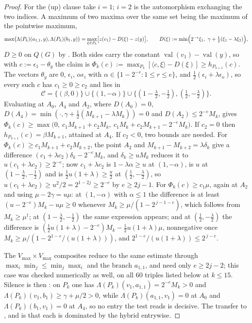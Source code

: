 \documentclass[11pt]{article}
\theoremstyle{plain}
\theoremstyle{definition}
\DeclareMathOperator{\val}{val}
\newcommand{\Vmax}{V_{\max}}
\begin{document}
\begin{proof}
For the (up) clause take $i=1$; $i=2$ is the automorphism exchanging the
two indices. A maximum of two maxima over the same set being the maximum
of the pointwise maximum,
\[
  \max\bigl(\Lambda(P_k)(a_{1,1},y),\Lambda(P_k)(b_1,y)\bigr)
  =\max_{\xi\in P_k}\bigl[z(v_1)-D(\xi)-z(y)\bigr],\qquad
  D(\xi):=\min\Bigl(2^{-e}\xi_1,\ \gamma+\tfrac12(\xi_1-\lambda\xi_2)\Bigr),
\]
$D\ge0$ on $Q(G)$ by . Both sides carry the constant
$\val(v_1)-\val(y)$, so with $c:=\epsilon_1-\theta_y$ the claim is
$\Phi_k(c):=\max_{P_k}[\langle c,\xi\rangle-D(\xi)]\ge h_{P_{k+1}}(c)$.
The vectors $\theta_y$ are $0$, $\epsilon_i$, $\alpha\epsilon_i$ with
$\alpha\in\{1-2^{-r}:1\le r\le e\}$, and
$\tfrac12(\epsilon_i+\lambda\epsilon_o)$, so every such $c$ has
$c_1\ge0\ge c_2$ and lies in
\[
  \mathcal C=\{(\beta,0)\}\cup\{(1,-\alpha)\}\cup
  \bigl\{(1-\tfrac\lambda2,-\tfrac12),(\tfrac12,-\tfrac\lambda2)\bigr\}.
\]
Evaluating at $A_0$, $A_4$ and $A_2$, where $D(A_0)=0$,
$D(A_4)=\min(\cdot,\gamma+\tfrac12(M_{k+1}-\lambda M_k))=0$ and
$D(A_2)\le2^{-e}M_k$, gives
$\Phi_k(c)\ge\max\bigl(0,\ c_1M_{k+1}+c_2M_k,\ c_1M_k+c_2M_{k+1}-2^{-e}M_k\bigr)$.
If $c_2=0$ then $h_{P_{k+1}}(c)=\beta M_{k+1}$, attained at $A_4$. If
$c_2<0$, two bounds are needed. For
$\Phi_k(c)\ge c_1M_{k+1}+c_2M_{k+2}$, the point $A_2$ and
$M_{k+1}-M_{k+2}=\lambda\delta_k$ give a difference
$(c_1+\lambda c_2)\delta_k-2^{-e}M_k$, and $\delta_k\ge uM_k$ reduces it to
$u(c_1+\lambda c_2)\ge2^{-e}$; now $c_1+\lambda c_2$ is $1-\lambda\alpha\ge u$
at $(1,-\alpha)$, is $u$ at $(1-\tfrac\lambda2,-\tfrac12)$ and is
$\tfrac12u(1+\lambda)\ge\tfrac u2$ at $(\tfrac12,-\tfrac\lambda2)$, so
$u(c_1+\lambda c_2)\ge u^2/2=2^{1-2j}\ge2^{-e}$ by $e\ge2j-1$. For
$\Phi_k(c)\ge c_1\mu$, again at $A_2$ and using $\mu-2\gamma=u\mu$: at
$(1,-\alpha)$ with $\alpha\le1$ the difference is at least
$(u-2^{-e})M_k-u\mu\ge0$ whenever $M_k\ge\mu/(1-2^{\,j-1-e})$, which
follows from $M_k\ge\mu^{\dagger}$; at $(1-\tfrac\lambda2,-\tfrac12)$ the
same expression appears; and at $(\tfrac12,-\tfrac\lambda2)$ the difference
is $(\tfrac12u(1+\lambda)-2^{-e})M_k-\tfrac12u(1+\lambda)\mu$, nonnegative
once $M_k\ge\mu/(1-2^{1-e}/(u(1+\lambda)))$, and
$2^{1-e}/(u(1+\lambda))\le2^{\,j-e}$.

The $\Vmax\times\Vmax$ composites reduce to the same estimate through
$\max_i\min_j\le\min_j\max_i$ and the branch $a_{1,1}$, and need only
$e\ge2j-2$; this case was checked numerically as well, on all $60$ triples
listed below at $k\le15$. Silence is then : on $P_k$ one has
$\Lambda(P_k)(v_1,a_{1,1})=2^{-e}M_k>0$ and
$\Lambda(P_k)(v_1,b_1)\ge\gamma+\mu/2>0$, while
$\Lambda(P_k)(a_{1,1},v_1)=0$ at $A_0$ and $\Lambda(P_k)(b_1,v_1)=0$ at
$A_4$, so no entry the test reads is decisive. The transfer to
,  and  is that
each is dominated by the hybrid entrywise.
\end{proof}
\end{document}
